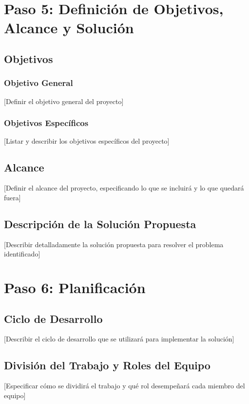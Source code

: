 \documentclass[12pt,letterpaper]{report}
\begin{document}
\section{Paso 5: Definición de Objetivos, Alcance y Solución}

\subsection{Objetivos}

\subsubsection{Objetivo General}
[Definir el objetivo general del proyecto]

\subsubsection{Objetivos Específicos}
[Listar y describir los objetivos específicos del proyecto]

\subsection{Alcance}
[Definir el alcance del proyecto, especificando lo que se incluirá y lo que quedará fuera]

\subsection{Descripción de la Solución Propuesta}
[Describir detalladamente la solución propuesta para resolver el problema identificado]

\section{Paso 6: Planificación}

\subsection{Ciclo de Desarrollo}
[Describir el ciclo de desarrollo que se utilizará para implementar la solución]

\subsection{División del Trabajo y Roles del Equipo}
[Especificar cómo se dividirá el trabajo y qué rol desempeñará cada miembro del equipo]
\end{document}
